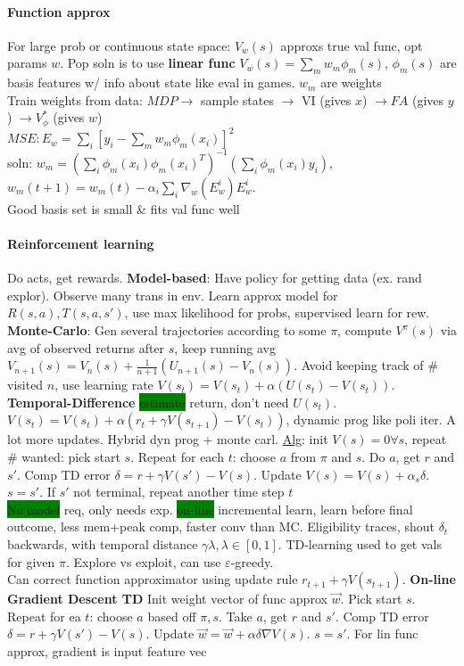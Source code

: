 \paragraph{Function approx} For large prob or continuous state space:
$V_w(s)$ approxs true val func, opt params $w$. Pop soln is to use
\textbf{linear func} $V_w(s)=\sum_mw_m\phi_m(s)$, $\phi_m(s)$ are
basis features w/ info about state like eval in games. $w_m$ are
weights
\\ Train weights from data: $MDP \to$ sample states $\to$ VI (gives
$x$) $\to FA$ (gives $y$) $\to V_\phi^*$ (gives $w$)
\\ $MSE:E_w = \sum_i [y_i - \sum_m w_m \phi_m (x_i)]^2$
\\ soln: $w_m=(\sum_i \phi_m (x_i)\phi_m(x_i)^T)^{-1}(\sum_i \phi_m
(x_i)y_i)$, $w_m(t+1)=w_m(t)-\alpha_i \sum_i \nabla_w (E^i_w)E^i_w$.
\\ Good basis set is small \& fits val func well
\paragraph{Reinforcement learning} Do acts, get
rewards. \textbf{Model-based}: Have policy for getting data (ex. rand
explor). Observe many trans in env. Learn approx model for
$R(s,a),T(s,a,s')$, use max likelihood for probs, supervised learn for
rew. \textbf{Monte-Carlo}: Gen several trajectories according to some
$\pi$, compute $V^{\pi}(s)$ via avg of observed returns after $s$, keep running avg
$V_{n+1}(s)=V_{n}(s)+\frac{1}{n+1}(U_{n+1}(s)-V_{n}(s))$. Avoid
keeping track of \# visited $n$, use learning rate
$V(s_t)=V(s_t)+\alpha(U(s_t)-V(s_t))$. \textbf{Temporal-Difference}
\colorbox{green}{estimate} return, don't need
$U(s_t)$. $V(s_t)=V(s_t)+\alpha(r_t+\gamma V(s_{t+1})-V(s_t))$,
dynamic prog like poli iter. A lot more updates. Hybrid dyn prog +
monte carl. \underline{Alg}: init $V(s)=0 \forall s$, repeat \#
wanted: pick start $s$. Repeat for each $t$: choose $a$ from $\pi$ and
$s$. Do $a$, get $r$ and $s'$. Comp TD error
$\delta = r + \gamma V(s')-V(s)$. Update $V(s)=V(s)+\alpha_s
\delta$. $s=s'$. If $s'$ not terminal, repeat another time step $t$ \\
\colorbox{green}{No model} req, only needs
exp. \colorbox{green}{on-line} incremental learn, learn before final
outcome, less mem+peak comp, faster conv than MC. Eligibility traces, shout
$\delta_t$ backwards, with temporal distance $\gamma \lambda, \lambda
\in [0,1]$. TD-learning used to get vals for given $\pi$. Explore vs
exploit, can use $\varepsilon$-greedy.
\\ Can correct function approximator using update rule $r_{t+1}+\gamma
V(s_{t+1})$. \textbf{On-line Gradient Descent TD} Init weight vector
of func approx $\vec{w}$. Pick start $s$. Repeat for ea $t$: choose $a$
based off $\pi,s$. Take $a$, get $r$ and $s'$. Comp TD error $\delta =
r + \gamma V(s')-V(s)$. Update $\vec{w} = \vec{w}+\alpha \delta \nabla
V(s)$. $s=s'$. For lin func approx, gradient is input feature vec


